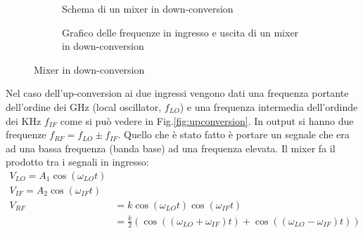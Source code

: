\documentclass{article}
\begin{document}
\begin{figure}[htbp]
    \centering
    \begin{subfigure}{0.4\textwidth}
        \centering
        \caption{Schema di un mixer in down-conversion} 
        \label{fig:downconversion}
    \end{subfigure}
    \begin{subfigure}{0.4\textwidth}
        \centering
        \caption{Grafico delle frequenze in ingresso e uscita di un mixer in down-conversion} 
    \end{subfigure}
    \caption{Mixer in down-conversion}
\end{figure}

Nel caso dell'up-conversion ai due ingressi vengono dati una frequenza portante dell'ordine dei GHz (local oscillator, $f_{LO}$) 
e una frequenza intermedia dell'ordinde dei KHz $f_{IF}$ come si può vedere in Fig.\ref{fig:upconversion}.
In output si hanno due frequenze $f_{RF} = f_{LO} \pm f_{IF}$. 
Quello che è stato fatto è portare un segnale che era ad una bassa frequenza (banda base) ad una frequenza elevata.
Il mixer fa il prodotto tra i segnali in ingresso:
\begin{align*}
    V_{LO} = A_1 \cos(\omega_{LO}t)\\
    V_{IF} = A_2 \cos(\omega_{IF}t)\\
    V_{RF} &= k \cos(\omega_{LO}t) \cos(\omega_{IF}t) \\
           &= \frac{k}{2} (\cos((\omega_{LO}+\omega_{IF})t) + \cos((\omega_{LO}-\omega_{IF})t) )
\end{align*}
\end{document}
